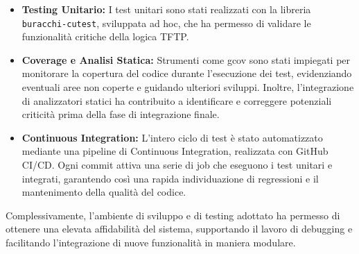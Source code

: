 \documentclass[12pt]{article}
\begin{document}
{\begin{itemize}
    \item \textbf{Testing Unitario:} I test unitari sono stati realizzati con la libreria \texttt{buracchi-cutest}, sviluppata ad hoc, che ha permesso di validare le funzionalità critiche della logica TFTP.
    \item \textbf{Coverage e Analisi Statica:} Strumenti come gcov sono stati impiegati per monitorare la copertura del codice durante l'esecuzione dei test, evidenziando eventuali aree non coperte e guidando ulteriori sviluppi. Inoltre, l'integrazione di analizzatori statici ha contribuito a identificare e correggere potenziali criticità prima della fase di integrazione finale.
    \item \textbf{Continuous Integration:} L'intero ciclo di test è stato automatizzato mediante una pipeline di Continuous Integration, realizzata con GitHub CI/CD. Ogni commit attiva una serie di job che eseguono i test unitari e integrati, garantendo così una rapida individuazione di regressioni e il mantenimento della qualità del codice.
\end{itemize}

Complessivamente, l'ambiente di sviluppo e di testing adottato ha permesso di ottenere una elevata affidabilità del sistema, supportando il lavoro di debugging e facilitando l'integrazione di nuove funzionalità in maniera modulare.

}
\end{document}
